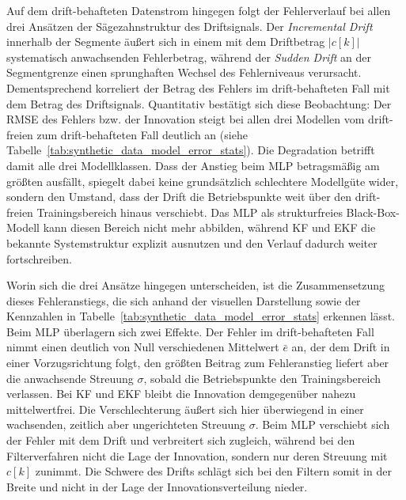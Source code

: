 Auf dem drift-behafteten Datenstrom hingegen folgt der Fehlerverlauf bei allen drei Ansätzen der Sägezahnstruktur des Driftsignals. Der \emph{Incremental Drift} innerhalb der Segmente äußert sich in einem mit dem Driftbetrag $|c[k]|$ systematisch anwachsenden Fehlerbetrag, während der \emph{Sudden Drift} an der Segmentgrenze einen sprunghaften Wechsel des Fehlerniveaus verursacht. Dementsprechend korreliert der Betrag des Fehlers im drift-behafteten Fall mit dem Betrag des Driftsignals.
Quantitativ bestätigt sich diese Beobachtung: Der \ac{RMSE} des Fehlers bzw. der Innovation steigt bei allen drei Modellen vom drift-freien zum drift-behafteten Fall deutlich an (siehe Tabelle~\ref{tab:synthetic_data_model_error_stats}). Die Degradation betrifft damit alle drei Modellklassen. Dass der Anstieg beim \ac{MLP} betragsmäßig am größten ausfällt, spiegelt dabei keine grundsätzlich schlechtere Modellgüte wider, sondern den Umstand, dass der Drift die Betriebspunkte weit über den drift-freien Trainingsbereich hinaus verschiebt. Das \ac{MLP} als strukturfreies Black-Box-Modell kann diesen Bereich nicht mehr abbilden, während \ac{KF} und \ac{EKF} die bekannte Systemstruktur explizit ausnutzen und den Verlauf dadurch weiter fortschreiben. \par
Worin sich die drei Ansätze hingegen unterscheiden, ist die Zusammensetzung dieses Fehleranstiegs, die sich anhand der visuellen Darstellung sowie der Kennzahlen in Tabelle~\ref{tab:synthetic_data_model_error_stats} erkennen lässt. 
Beim \ac{MLP} überlagern sich zwei Effekte. Der Fehler im drift-behafteten Fall nimmt einen deutlich von Null verschiedenen Mittelwert $\bar{e}$ an, der dem Drift in einer Vorzugsrichtung folgt, den größten Beitrag zum Fehleranstieg liefert aber die anwachsende Streuung $\sigma$, sobald die Betriebspunkte den Trainingsbereich verlassen. Bei \ac{KF} und \ac{EKF} bleibt die Innovation demgegenüber nahezu mittelwertfrei. Die Verschlechterung äußert sich hier überwiegend in einer wachsenden, zeitlich aber ungerichteten Streuung $\sigma$. Beim \ac{MLP} verschiebt sich der Fehler mit dem Drift und verbreitert sich zugleich, während bei den Filterverfahren nicht die Lage der Innovation, sondern nur deren Streuung mit $c[k]$ zunimmt. Die Schwere des Drifts schlägt sich bei den Filtern somit in der Breite und nicht in der Lage der Innovationsverteilung nieder. \par
%
